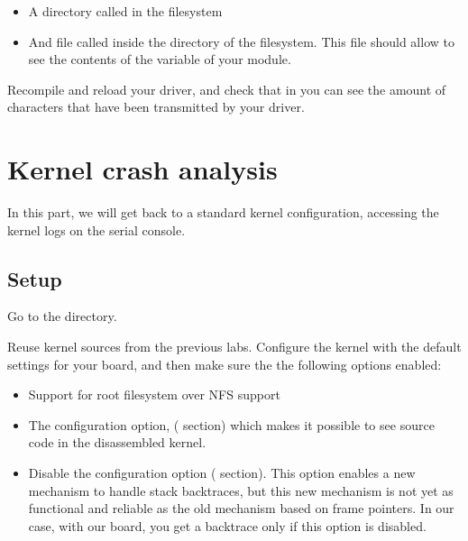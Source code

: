 \begin{itemize}

\item A directory called  in the  filesystem

\item And file called  inside the 
  directory of the  filesystem. This file should allow to see
  the contents of the  variable of your module.

\end{itemize}

Recompile and reload your driver, and check that in
 you can see the amount of characters
that have been transmitted by your driver.

\section{Kernel crash analysis}

In this part, we will get back to a standard kernel configuration,
accessing the kernel logs on the serial console.

\subsection{Setup}

Go to the  directory.

Reuse kernel sources from the previous labs. Configure the kernel
with the default settings for your board, and then make sure the
the following options enabled:

\begin{itemize}

\item Support for root filesystem over NFS support

\item The  configuration option,
  ( section) which makes it possible to see source
  code in the disassembled kernel.

\item Disable the  configuration option
  ( section). This option enables a new mechanism to
  handle stack backtraces, but this new mechanism is not yet as
  functional and reliable as the old mechanism based on frame
  pointers. In our case, with our board, you get a backtrace only if
  this option is disabled.

\end{itemize}


